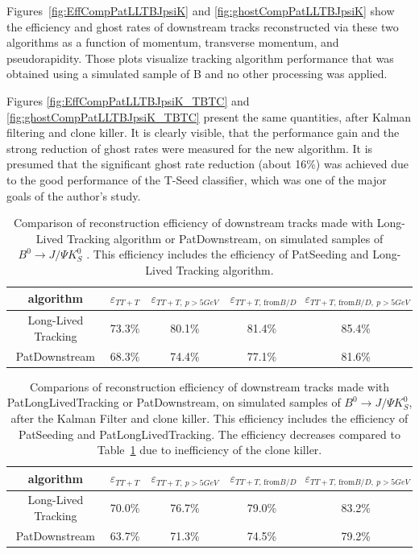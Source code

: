 Figures~\ref{fig:EffCompPatLLTBJpsiK} and \ref{fig:ghostCompPatLLTBJpsiK} show the efficiency and ghost rates of downstream tracks reconstructed via these two algorithms as a function of momentum, transverse momentum, and pseudorapidity. Those plots visualize tracking algorithm performance that was obtained using a simulated sample of B  and no other processing was applied. 

Figures \ref{fig:EffCompPatLLTBJpsiK_TBTC} and \ref{fig:ghostCompPatLLTBJpsiK_TBTC} present the same quantities, after Kalman filtering and clone killer. 
It is clearly visible, that the performance gain and the strong reduction of ghost rates were measured for the new algorithm. It is presumed that the significant ghost rate reduction (about 16\%) was achieved due to the good performance of the T-Seed classifier, which was one of the major goals of the author’s study. 


\begin{table}[htp]
\caption{Comparison of reconstruction efficiency of downstream tracks made with Long-Lived Tracking algorithm or PatDownstream, on simulated samples of $B^{0} \rightarrow J/\Psi K^{0}_{S}$ . This efficiency includes the efficiency of PatSeeding and Long-Lived Tracking algorithm.}
\begin{center}
\begin{tabular}{c|c|c|c|c}
algorithm & $\varepsilon_{TT+T}$ & $\varepsilon_{TT+T, ~p>5 GeV}$ & $\varepsilon_{TT+T\text{, from} B/D}$ & $\varepsilon_{TT+T\text{, from} B/D, ~p>5 GeV}$ \\
\hline 
Long-Lived Tracking & 73.3\% & 80.1\% & 81.4\% & 85.4\%\\
PatDownstream          & 68.3\% & 74.4\% & 77.1\% & 81.6\% 
\end{tabular}
\end{center}
\label{tab:PatLLTPatDownstreamEffComp}
\end{table}%

\begin{table}[htp]
\caption{Comparions of reconstruction efficiency of downstream tracks made with PatLongLivedTracking or PatDownstream, on simulated samples of $B^{0} \rightarrow J/\Psi K^{0}_{S}$, after the Kalman Filter and clone killer. This efficiency includes the efficiency of PatSeeding and PatLongLivedTracking. The efficiency decreases compared to Table~\ref{tab:PatLLTPatDownstreamEffComp} due to inefficiency of the clone killer.}
\begin{center}
\begin{tabular}{c|c|c|c|c}
algorithm & $\varepsilon_{TT+T}$ & $\varepsilon_{TT+T, ~p>5 GeV}$ & $\varepsilon_{TT+T\text{, from} B/D}$ & $\varepsilon_{TT+T\text{, from} B/D, ~p>5 GeV}$ \\
\hline 
Long-Lived Tracking & 70.0\% & 76.7\% & 79.0\% & 83.2\% \\
PatDownstream          & 63.7\% & 71.3\% & 74.5\% & 79.2\% 
\end{tabular}
\end{center}
\label{tab:PatLLTPatDownstreamEffCompTBTC}
\end{table}%

